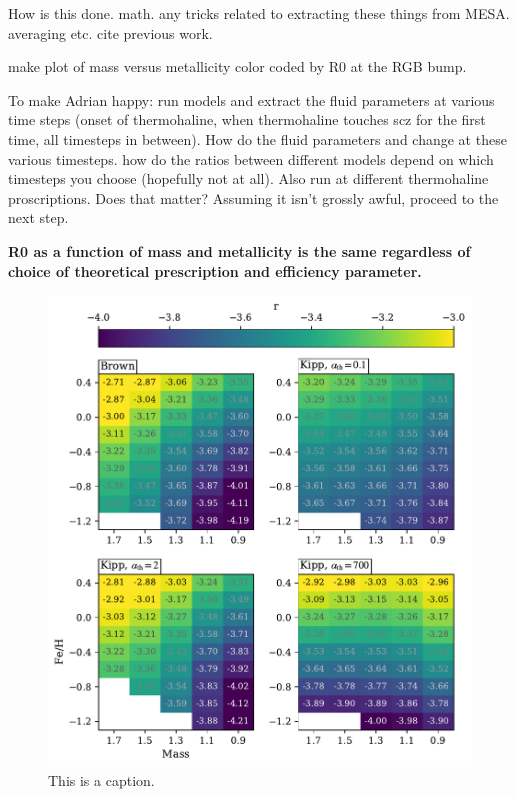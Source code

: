 How is this done. math. any tricks related to extracting these things from MESA. averaging etc. cite previous work.

make plot of mass versus metallicity color coded by R0 at the RGB bump.


To make Adrian happy: run models and extract the fluid parameters at various time steps (onset of thermohaline, when thermohaline touches scz for the first time, all timesteps in between). How do the fluid parameters and change at these various timesteps. how do the ratios between different models depend on which timesteps you choose (hopefully not at all). Also run at different thermohaline proscriptions. Does that matter? Assuming it isn't grossly awful, proceed to the next step.


\textbf{R0 as a function of mass and metallicity is the same regardless of choice of theoretical prescription and efficiency parameter.}


\begin{figure}
    \centering
    \includegraphics[width=\textwidth]{figures/mesa_spread/mesa_r_spread.pdf}
    \caption{This is a caption. }
    \label{fig:mesa_r_spread}
\end{figure}